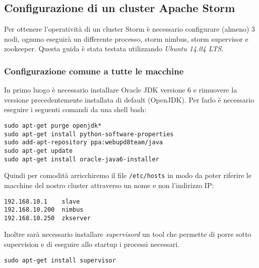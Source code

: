 \documentclass[12pt]{article}
\begin{document}
\subsection{Configurazione di un cluster Apache Storm}
Per ottenere l'operativit\`a di un cluster Storm \`e necessario configurare (almeno) 3 nodi, ognuno eseguir\`a un differente processo, storm nimbus, storm supervisor e zookeeper.
Questa guida \`e stata testata utilizzando \emph{Ubuntu 14.04 LTS}.
\subsubsection{Configurazione comune a tutte le macchine}
In primo luogo \`e necessario installare Oracle JDK versione 6 e rimuovere la versione precedentemente installata di default (OpenJDK).
Per farlo \`e necessario eseguire i seguenti comandi da una shell bash:
\begin{lstlisting}
sudo apt-get purge openjdk*
sudo apt-get install python-software-properties
sudo add-apt-repository ppa:webupd8team/java
sudo apt-get update
sudo apt-get install oracle-java6-installer
\end{lstlisting}
Quindi per comodit\`a arricchiremo il file \texttt{/etc/hosts} in modo da poter riferire le macchine del nostro cluster attraverso un nome e non l'indirizzo IP:
\begin{lstlisting}
192.168.10.1    slave
192.168.10.200  nimbus
192.168.10.250  zkserver
\end{lstlisting}
Inoltre sar\`a necessario installare \emph{supervisord} un tool che permette di porre sotto supervision e di eseguire allo startup i processi necessari.
\begin{lstlisting}
sudo apt-get install supervisor
\end{lstlisting}
\end{document}
